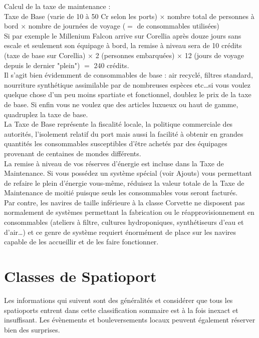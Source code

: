 \documentclass{article}
\begin{document}
Calcul de la taxe de maintenance : \\

Taxe de Base (varie de 10 à 50 Cr selon les ports) $\times$ nombre total de personnes à bord $\times$ nombre de journées de voyage ($=$ de consommables utilisées)\\

Si par exemple le Millenium Falcon arrive sur Corellia après douze jours sans escale et seulement son équipage à bord, la remise à niveau sera de 10 crédits (taxe de base sur Corellia) $\times$ 2 (personnes embarquées) $\times$ 12 (jours de voyage depuis le dernier "plein") $=$ 240 crédits.\\

Il s'agit bien évidemment de consommables de base : air recyclé, filtres standard, nourriture synthétique assimilable par de nombreuses espèces etc\ldots si vous voulez quelque chose d'un peu moins spartiate et fonctionnel, doublez le prix de la taxe de base. Si enfin vous ne voulez que des articles luxueux ou haut de gamme, quadruplez la taxe de base.\\

La Taxe de Base représente la fiscalité locale, la politique commerciale des autorités, l'isolement relatif du port mais aussi la facilité à obtenir en grandes quantités les consommables susceptibles d'être achetés par des équipages provenant de centaines de mondes différents. \\

La remise à niveau de vos réserves d'énergie est incluse dans la Taxe de Maintenance. Si vous possédez un système spécial (voir Ajouts) vous permettant de refaire le plein d'énergie vous-même, réduisez la valeur totale de la Taxe de Maintenance de moitié puisque seuls les consommables vous seront facturés.\\

Par contre, les navires de taille inférieure à la classe Corvette ne disposent pas normalement de systèmes permettant la fabrication ou le réapprovisionnement en consommables (ateliers à filtre, cultures hydroponiques, synthétiseurs d'eau et d'air\ldots) et ce genre de système requiert énormément de place sur les navires capable de les accueillir et de les faire fonctionner.

\section*{Classes de Spatioport}
Les informations qui suivent sont des généralités et considérer que tous les spatioports entrent dans cette classification sommaire est à la fois inexact et insuffisant. Les évènements et bouleversements locaux peuvent également réserver bien des surprises.
\end{document}
